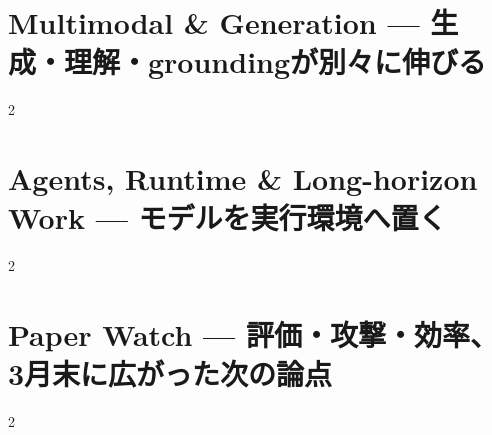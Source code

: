 \documentclass[lualatex,a4paper,11pt]{jlreq}
\begin{document}
\Needspace{0.45\textheight}
\bigskip
\section{Multimodal \& Generation — 生成・理解・groundingが別々に伸びる}
\label{pkg:multimodal-generation-march}
\vspace{0.15em}

\vspace{0.2em}
\begin{multicols}{2}

\end{multicols}

\medskip


\Needspace{0.45\textheight}
\bigskip
\section{Agents, Runtime \& Long-horizon Work — モデルを実行環境へ置く}
\label{pkg:agents-runtime-long-horizon-march}
\vspace{0.15em}

\vspace{0.2em}
\begin{multicols}{2}

\end{multicols}

\medskip


\Needspace{0.45\textheight}
\bigskip
\section{Paper Watch — 評価・攻撃・効率、3月末に広がった次の論点}
\label{pkg:paper-watch-march}
\vspace{0.15em}

\vspace{0.2em}
\begin{multicols}{2}

\end{multicols}

\medskip


\Needspace{0.30\textheight}
\bigskip
\printbibliography[title={References / Source Notes}]
\end{document}
